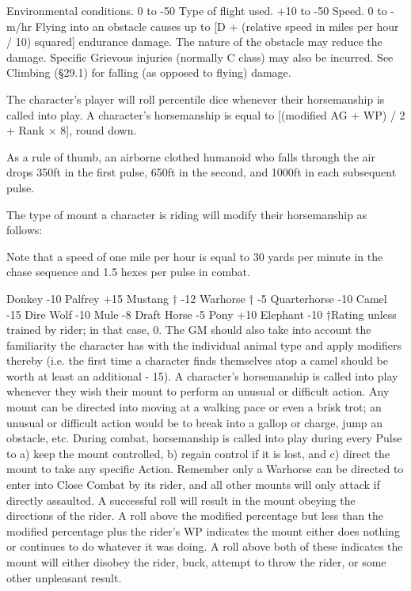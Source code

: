 \documentclass[a4paper]{article}
\begin{document}
\begin{multicols}{3}
Environmental conditions. 0 to -50
Type of flight used.
+10 to -50
Speed.
0 to -m/hr
Flying into an obstacle causes up to [D + (relative
speed in miles per hour / 10) squared] endurance
damage. The nature of the obstacle may reduce the
damage. Specific Grievous injuries (normally C
class) may also be incurred. See Climbing (§29.1)
for falling (as opposed to flying) damage.

The character’s player will roll percentile dice
whenever their horsemanship is called into play. A
character’s horsemanship is equal to [(modified
AG + WP) / 2 + Rank × 8], round down.

As a rule of thumb, an airborne clothed humanoid
who falls through the air drops 350ft in the first
pulse, 650ft in the second, and 1000ft in each subsequent pulse.

The type of mount a character is riding will modify
their horsemanship as follows:

Note that a speed of one mile per hour is equal to
30 yards per minute in the chase sequence and 1.5
hexes per pulse in combat.

Donkey
-10 Palfrey
+15
Mustang †
-12 Warhorse † -5
Quarterhorse -10 Camel
-15
Dire Wolf
-10 Mule
-8
Draft Horse
-5
Pony
+10
Elephant
-10
†Rating unless trained by rider; in that case, 0.
The GM should also take into account the familiarity the character has with the individual animal
type and apply modifiers thereby (i.e. the first time
a character finds themselves atop a camel should
be worth at least an additional - 15).
A character’s horsemanship is called into play
whenever they wish their mount to perform an
unusual or difficult action. Any mount can be
directed into moving at a walking pace or even a
brisk trot; an unusual or difficult action would be
to break into a gallop or charge, jump an obstacle,
etc. During combat, horsemanship is called into
play during every Pulse to a) keep the mount controlled, b) regain control if it is lost, and c) direct
the mount to take any specific Action. Remember
only a Warhorse can be directed to enter into Close
Combat by its rider, and all other mounts will only
attack if directly assaulted.
A successful roll will result in the mount obeying
the directions of the rider. A roll above the modified percentage but less than the modified percentage plus the rider’s WP indicates the mount either
does nothing or continues to do whatever it was
doing. A roll above both of these indicates the
mount will either disobey the rider, buck, attempt
to throw the rider, or some other unpleasant result.


\end{multicols}
\end{document}
